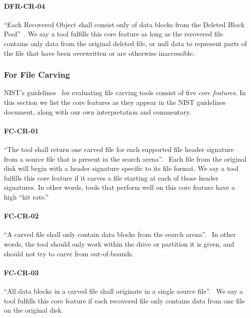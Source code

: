  \paragraph{DFR-CR-04} ``Each Recovered Object shall consist only of data blocks from the Deleted Block Pool''~\cite{meta:dfr:standards}.
 We say a tool fulfills this core feature as long as the recovered file contains only data from the original deleted file, or null data to represent parts of the file that have been overwritten or are otherwise inaccessible.

\subsubsection{For File Carving} \label{sec:carving_features}

NIST's guidelines~\cite{carving_standards} for evaluating file carving tools consist of five \emph{core features}.
In this section we list the core features as they appear in the NIST guidelines document, along with our own interpretation and commentary.

 \paragraph{FC-CR-01} ``The tool shall return one carved file for each supported file header signature from a source file that is present in the search arena''.~\cite{carving_standards}
 Each file from the original disk will begin with a header signature specific to its file format. We say a tool fulfills this core feature if it carves a file starting at each of those header signatures.
 In other words, tools that perform well on this core feature have a high ``hit rate.''
 
 \paragraph{FC-CR-02} ``A carved file shall only contain data blocks from the search arena''.~\cite{carving_standards}
 In other words, the tool should only work within the drive or partition it is given, and should not try to carve from out-of-bounds.
 
 \paragraph{FC-CR-03} ``All data blocks in a carved file shall originate in a single source file''.~\cite{carving_standards}
 We say a tool fulfills this core feature if each recovered file only contains data from one file on the original disk.
 
